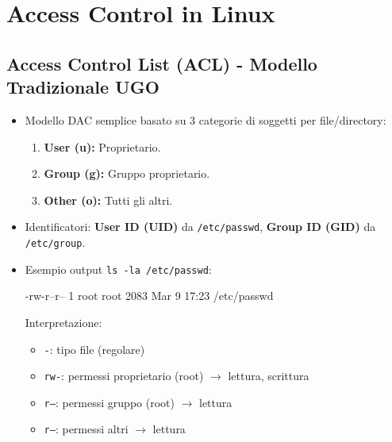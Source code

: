 \documentclass{article}
\begin{document}
\section{Access Control in Linux}
\subsection{Access Control List (ACL) - Modello Tradizionale UGO}
\begin{itemize}
    \item Modello DAC semplice basato su 3 categorie di soggetti per file/directory:
    \begin{enumerate}
        \item \textbf{User (u):} Proprietario.
        \item \textbf{Group (g):} Gruppo proprietario.
        \item \textbf{Other (o):} Tutti gli altri.
    \end{enumerate}
    \item Identificatori: \textbf{User ID (UID)} da \texttt{/etc/passwd}, \textbf{Group ID (GID)} da \texttt{/etc/group}.
    \item Esempio output \texttt{ls -la /etc/passwd}:
    \begin{bashcode}
-rw-r--r-- 1 root root 2083 Mar  9 17:23 /etc/passwd
    \end{bashcode}
    Interpretazione:
    \begin{itemize}
        \item \texttt{-}: tipo file (regolare)
        \item \texttt{rw-}: permessi proprietario (root) $\rightarrow$ lettura, scrittura
        \item \texttt{r--}: permessi gruppo (root) $\rightarrow$ lettura
        \item \texttt{r--}: permessi altri $\rightarrow$ lettura
    \end{itemize}
\end{itemize}
\end{document}
